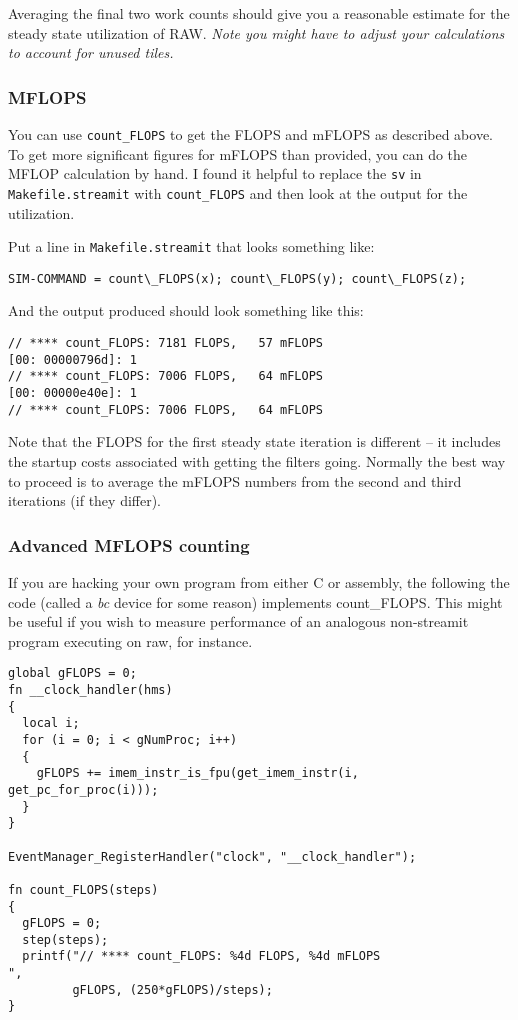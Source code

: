 \documentclass{article}
\begin{document}
Averaging the final two work counts should give you a reasonable estimate for
the steady state utilization of RAW. \textit{Note you might have to adjust your calculations
to account for unused tiles.}

\subsubsection{MFLOPS} 
You can use \texttt{count\_FLOPS} to get the FLOPS and mFLOPS as described above. To get more
significant figures for mFLOPS than provided, you can do the MFLOP calculation by hand. I found it
helpful to replace the \texttt{sv} in \texttt{Makefile.streamit} with \texttt{count\_FLOPS} and then look
at the output for the utilization.

Put a line in \texttt{Makefile.streamit} that looks something like:
\begin{verbatim}SIM-COMMAND = count\_FLOPS(x); count\_FLOPS(y); count\_FLOPS(z);\end{verbatim} 


And the output produced should look something like this:
\begin{verbatim}
// **** count_FLOPS: 7181 FLOPS,   57 mFLOPS
[00: 00000796d]: 1
// **** count_FLOPS: 7006 FLOPS,   64 mFLOPS
[00: 00000e40e]: 1
// **** count_FLOPS: 7006 FLOPS,   64 mFLOPS
\end{verbatim}

Note that the FLOPS for the first steady state iteration is different -- 
it includes the startup costs associated with getting the filters going. Normally the best 
way to proceed is to average the mFLOPS numbers from the second and
third iterations (if they differ).

\subsubsection{Advanced MFLOPS counting}
If you are hacking your own program from either C or assembly, 
the following the code (called a \textit{bc} device for some reason) implements count\_FLOPS.
This might be useful if you wish to measure performance of an analogous non-streamit
program executing on raw, for instance.

\begin{verbatim}
global gFLOPS = 0;
fn __clock_handler(hms)
{
  local i;
  for (i = 0; i < gNumProc; i++)
  {
    gFLOPS += imem_instr_is_fpu(get_imem_instr(i, get_pc_for_proc(i)));
  }
}

EventManager_RegisterHandler("clock", "__clock_handler");

fn count_FLOPS(steps)
{
  gFLOPS = 0;
  step(steps);
  printf("// **** count_FLOPS: %4d FLOPS, %4d mFLOPS
",
         gFLOPS, (250*gFLOPS)/steps);
}


\end{verbatim}
\end{document}
